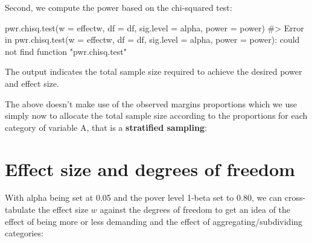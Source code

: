 \documentclass[
  letterpaper,
  DIV=11,
  numbers=noendperiod]{scrreprt}
\newenvironment{Shaded}{\begin{snugshade}}{\end{snugshade}}
\newcommand{\AttributeTok}[1]{\textcolor[rgb]{0.40,0.45,0.13}{#1}}
\newcommand{\CommentTok}[1]{\textcolor[rgb]{0.37,0.37,0.37}{#1}}
\newcommand{\FloatTok}[1]{\textcolor[rgb]{0.68,0.00,0.00}{#1}}
\newcommand{\FunctionTok}[1]{\textcolor[rgb]{0.28,0.35,0.67}{#1}}
\newcommand{\NormalTok}[1]{\textcolor[rgb]{0.00,0.23,0.31}{#1}}
\newcommand{\OtherTok}[1]{\textcolor[rgb]{0.00,0.23,0.31}{#1}}
\newcommand{\SpecialCharTok}[1]{\textcolor[rgb]{0.37,0.37,0.37}{#1}}
\begin{document}
Second, we compute the power based on the chi-squared test:

\begin{Shaded}
\begin{Highlighting}[]
\FunctionTok{pwr.chisq.test}\NormalTok{(}\AttributeTok{w =}\NormalTok{ effectw, }\AttributeTok{df =}\NormalTok{ df, }\AttributeTok{sig.level =}\NormalTok{ alpha, }\AttributeTok{power =}\NormalTok{ power)}
\CommentTok{\#\textgreater{} Error in pwr.chisq.test(w = effectw, df = df, sig.level = alpha, power = power): could not find function "pwr.chisq.test"}
\end{Highlighting}
\end{Shaded}

The output indicates the total sample size required to achieve the
desired power and effect size.

The above doesn't make use of the observed margins proportions which we
use simply now to allocate the total sample size according to the
proportions for each category of variable A, that is a
\textbf{stratified sampling}:

\begin{Shaded}
\end{Shaded}

\section{Effect size and degrees of
freedom}\label{effect-size-and-degrees-of-freedom}

With alpha being set at 0.05 and the pover level 1-beta set to 0.80, we
can cross-tabulate the effect size \(w\) against the degrees of freedom
to get an idea of the effect of being more or less demanding and the
effect of aggregating/subdividing categories:
\end{document}
